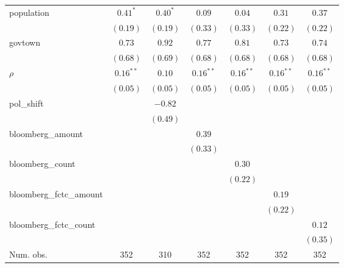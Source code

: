 \begin{table}[!h]
\begin{center}
\begin{tabular}{l c c c c c c }
population              & $0.41^{*}$   & $0.40^{*}$   & $0.09$       & $0.04$       & $0.31$       & $0.37$       \\
                        & $(0.19)$     & $(0.19)$     & $(0.33)$     & $(0.33)$     & $(0.22)$     & $(0.22)$     \\
govtown                 & $0.73$       & $0.92$       & $0.77$       & $0.81$       & $0.73$       & $0.74$       \\
                        & $(0.68)$     & $(0.69)$     & $(0.68)$     & $(0.68)$     & $(0.68)$     & $(0.68)$     \\
$\rho$                  & $0.16^{**}$  & $0.10$       & $0.16^{**}$  & $0.16^{**}$  & $0.16^{**}$  & $0.16^{**}$  \\
                        & $(0.05)$     & $(0.05)$     & $(0.05)$     & $(0.05)$     & $(0.05)$     & $(0.05)$     \\
pol\_shift              &              & $-0.82$      &              &              &              &              \\
                        &              & $(0.49)$     &              &              &              &              \\
bloomberg\_amount       &              &              & $0.39$       &              &              &              \\
                        &              &              & $(0.33)$     &              &              &              \\
bloomberg\_count        &              &              &              & $0.30$       &              &              \\
                        &              &              &              & $(0.22)$     &              &              \\
bloomberg\_fctc\_amount &              &              &              &              & $0.19$       &              \\
                        &              &              &              &              & $(0.22)$     &              \\
bloomberg\_fctc\_count  &              &              &              &              &              & $0.12$       \\
                        &              &              &              &              &              & $(0.35)$     \\
\midrule
Num. obs.               & 352          & 310          & 352          & 352          & 352          & 352          \\

\end{tabular}
\end{center}
\end{table}
